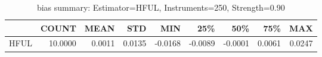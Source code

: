 \begin{table}[ht]
\centering
\caption{bias summary: Estimator=HFUL, Instruments=250, Strength=0.90}
\begin{tabular}{lrrrrrrrr}
\toprule
 & COUNT & MEAN & STD & MIN & 25\% & 50\% & 75\% & MAX \\
\midrule
HFUL & 10.0000 & 0.0011 & 0.0135 & -0.0168 & -0.0089 & -0.0001 & 0.0061 & 0.0247 \\
\bottomrule
\end{tabular}
\end{table}
